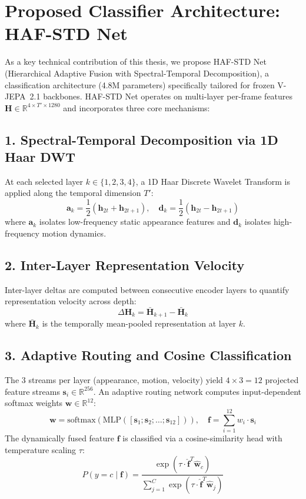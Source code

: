 \section{Proposed Classifier Architecture: HAF-STD Net}
\label{sec:proposal_hafstd}

As a key technical contribution of this thesis, we propose HAF-STD Net (Hierarchical Adaptive Fusion with Spectral-Temporal Decomposition), a classification architecture (4.8M parameters) specifically tailored for frozen V-JEPA~2.1 backbones. HAF-STD Net operates on multi-layer per-frame features $\mathbf{H} \in \mathbb{R}^{4 \times T' \times 1280}$ and incorporates three core mechanisms:

\subsection{1. Spectral-Temporal Decomposition via 1D Haar DWT}
At each selected layer $k \in \{1, 2, 3, 4\}$, a 1D Haar Discrete Wavelet Transform is applied along the temporal dimension $T'$:
\begin{equation*}
    \mathbf{a}_k = \frac{1}{2}(\mathbf{h}_{2t} + \mathbf{h}_{2t+1}), \quad
    \mathbf{d}_k = \frac{1}{2}(\mathbf{h}_{2t} - \mathbf{h}_{2t+1})
\end{equation*}
where $\mathbf{a}_k$ isolates low-frequency static appearance features and $\mathbf{d}_k$ isolates high-frequency motion dynamics.

\subsection{2. Inter-Layer Representation Velocity}
Inter-layer deltas are computed between consecutive encoder layers to quantify representation velocity across depth:
\begin{equation*}
    \Delta\mathbf{H}_k = \bar{\mathbf{H}}_{k+1} - \bar{\mathbf{H}}_k
\end{equation*}
where $\bar{\mathbf{H}}_k$ is the temporally mean-pooled representation at layer $k$.

\subsection{3. Adaptive Routing and Cosine Classification}
The 3 streams per layer (appearance, motion, velocity) yield $4 \times 3 = 12$ projected feature streams $\mathbf{s}_i \in \mathbb{R}^{256}$. An adaptive routing network computes input-dependent softmax weights $\mathbf{w} \in \mathbb{R}^{12}$:
\begin{equation*}
    \mathbf{w} = \text{softmax}\left(\text{MLP}\left([\mathbf{s}_1; \mathbf{s}_2; \dots; \mathbf{s}_{12}]\right)\right), \quad
    \mathbf{f} = \sum_{i=1}^{12} w_i \cdot \mathbf{s}_i
\end{equation*}
The dynamically fused feature $\mathbf{f}$ is classified via a cosine-similarity head with temperature scaling $\tau$:
\begin{equation*}
    P(y = c \mid \mathbf{f}) = \frac{\exp\left(\tau \cdot \hat{\mathbf{f}}^T \hat{\mathbf{w}}_c\right)}{\sum_{j=1}^C \exp\left(\tau \cdot \hat{\mathbf{f}}^T \hat{\mathbf{w}}_j\right)}
\end{equation*}


